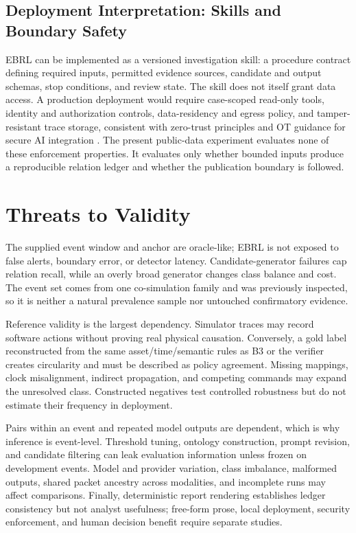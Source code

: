 \documentclass[conference]{IEEEtran}
\begin{document}
\subsection{Deployment Interpretation: Skills and Boundary Safety}

EBRL can be implemented as a versioned investigation skill: a procedure contract defining required inputs, permitted evidence sources, candidate and output schemas, stop conditions, and review state. The skill does not itself grant data access. A production deployment would require case-scoped read-only tools, identity and authorization controls, data-residency and egress policy, and tamper-resistant trace storage, consistent with zero-trust principles \cite{rose2020zerotrust} and OT guidance for secure AI integration \cite{cisa2025secureaiot}. The present public-data experiment evaluates none of these enforcement properties. It evaluates only whether bounded inputs produce a reproducible relation ledger and whether the publication boundary is followed.

\section{Threats to Validity}

The supplied event window and anchor are oracle-like; EBRL is not exposed to false alerts, boundary error, or detector latency. Candidate-generator failures cap relation recall, while an overly broad generator changes class balance and cost. The event set comes from one co-simulation family and was previously inspected, so it is neither a natural prevalence sample nor untouched confirmatory evidence.

Reference validity is the largest dependency. Simulator traces may record software actions without proving real physical causation. Conversely, a gold label reconstructed from the same asset/time/semantic rules as B3 or the verifier creates circularity and must be described as policy agreement. Missing mappings, clock misalignment, indirect propagation, and competing commands may expand the unresolved class. Constructed negatives test controlled robustness but do not estimate their frequency in deployment.

Pairs within an event and repeated model outputs are dependent, which is why inference is event-level. Threshold tuning, ontology construction, prompt revision, and candidate filtering can leak evaluation information unless frozen on development events. Model and provider variation, class imbalance, malformed outputs, shared packet ancestry across modalities, and incomplete runs may affect comparisons. Finally, deterministic report rendering establishes ledger consistency but not analyst usefulness; free-form prose, local deployment, security enforcement, and human decision benefit require separate studies.
\end{document}
